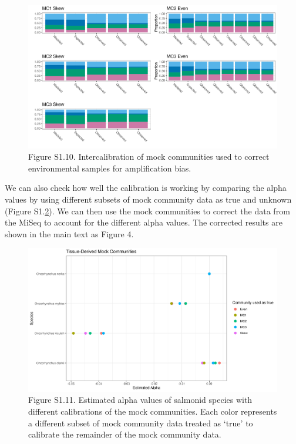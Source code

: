 \documentclass[
]{article}
\begin{document}
\begin{figure}
\centering
\includegraphics{../Output/SupplementalFigures/mock_internal_calibration.png}
\caption{Figure S1.10. Intercalibration of mock communities used to
correct environmental samples for amplification
bias.\label{fig:intercal}}
\end{figure}

We can also check how well the calibration is working by comparing the
alpha values by using different subsets of mock community data as true
and unknown (Figure S1.\ref{fig:alphas}). We can then use the mock
communities to correct the data from the MiSeq to account for the
different alpha values. The corrected results are shown in the main text
as Figure 4.

\begin{figure}
\centering
\includegraphics{../Output/SupplementalFigures/mock_internal_calibration_compare_alphas.png}
\caption{Figure S1.11. Estimated alpha values of salmonid species with
different calibrations of the mock communities. Each color represents a
different subset of mock community data treated as `true' to calibrate
the remainder of the mock community data.\label{fig:alphas}}
\end{figure}
\end{document}
